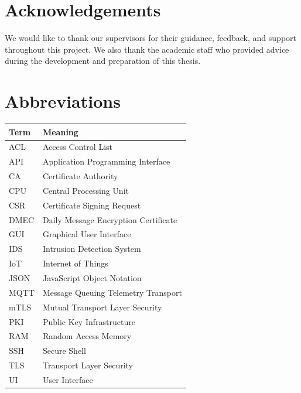 \documentclass[12pt,a4paper]{report}
\begin{document}
\chapter*{Acknowledgements}
{}

We would like to thank our supervisors for their guidance, feedback, and support throughout this project.
We also thank the academic staff who provided advice during the development and preparation of this thesis.


\tableofcontents
\listoffigures
\listoftables

\clearpage

\chapter*{Abbreviations}
{}

\begin{tabularx}{\textwidth}{|P{2.5cm}|Y|}
    \hline
    \textbf{Term} & \textbf{Meaning} \\
    \hline
    ACL & Access Control List \\
    \hline
    API & Application Programming Interface \\
    \hline
    CA & Certificate Authority \\
    \hline
    CPU & Central Processing Unit \\
    \hline
    CSR & Certificate Signing Request \\
    \hline
    DMEC & Daily Message Encryption Certificate \\
    \hline
    GUI & Graphical User Interface \\
    \hline
    IDS & Intrusion Detection System \\
    \hline
    IoT & Internet of Things \\
    \hline
    JSON & JavaScript Object Notation \\
    \hline
    MQTT & Message Queuing Telemetry Transport \\
    \hline
    mTLS & Mutual Transport Layer Security \\
    \hline
    PKI & Public Key Infrastructure \\
    \hline
    RAM & Random Access Memory \\
    \hline
    SSH & Secure Shell \\
    \hline
    TLS & Transport Layer Security \\
    \hline
    UI & User Interface \\
    \hline
\end{tabularx}
\end{document}
